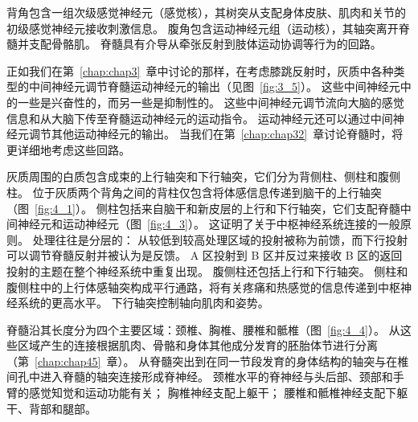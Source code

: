 背角包含一组次级感觉神经元（感觉核），其树突从支配身体皮肤、肌肉和关节的初级感觉神经元接收刺激信息。
腹角包含运动神经元组（运动核），其轴突离开脊髓并支配骨骼肌。
脊髓具有介导从牵张反射到肢体运动协调等行为的回路。


正如我们在第~\ref{chap:chap3}~章中讨论的那样，在考虑膝跳反射时，灰质中各种类型的中间神经元调节脊髓运动神经元的输出（见图~\ref{fig:3_5}）。 
这些中间神经元中的一些是兴奋性的，而另一些是抑制性的。
这些中间神经元调节流向大脑的感觉信息和从大脑下传至脊髓运动神经元的运动指令。
运动神经元还可以通过中间神经元调节其他运动神经元的输出。
当我们在第~\ref{chap:chap32}~章讨论脊髓时，将更详细地考虑这些回路。


灰质周围的白质包含成束的上行轴突和下行轴突，它们分为背侧柱、侧柱和腹侧柱。
位于灰质两个背角之间的背柱仅包含将体感信息传递到脑干的上行轴突（图~\ref{fig:4_1}）。
侧柱包括来自脑干和新皮层的上行和下行轴突，它们支配脊髓中间神经元和运动神经元（图~\ref{fig:4_3}）。 
这证明了关于中枢神经系统连接的一般原则。
处理往往是分层的：
从较低到较高处理区域的投射被称为前馈，而下行投射可以调节脊髓反射并被认为是反馈。 
A 区投射到 B 区并反过来接收 B 区的返回投射的主题在整个神经系统中重复出现。 
腹侧柱还包括上行和下行轴突。 
侧柱和腹侧柱中的上行体感轴突构成平行通路，将有关疼痛和热感觉的信息传递到中枢神经系统的更高水平。 
下行轴突控制轴向肌肉和姿势。


脊髓沿其长度分为四个主要区域：颈椎、胸椎、腰椎和骶椎（图~\ref{fig:4_4}）。 
从这些区域产生的连接根据肌肉、骨骼和身体其他成分发育的胚胎体节进行分离（第~\ref{chap:chap45}~章）。 
从脊髓突出到在同一节段发育的身体结构的轴突与在椎间孔中进入脊髓的轴突连接形成脊神经。 
颈椎水平的脊神经与头后部、颈部和手臂的感觉知觉和运动功能有关； 
胸椎神经支配上躯干； 腰椎和骶椎神经支配下躯干、背部和腿部。


